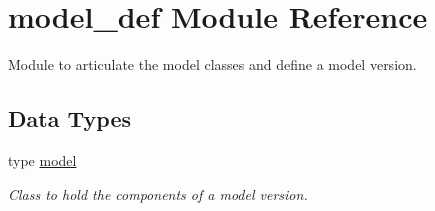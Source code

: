 \hypertarget{namespacemodel__def}{}\section{model\+\_\+def Module Reference}
\label{namespacemodel__def}


Module to articulate the model classes and define a model version.  


\subsection*{Data Types}
\begin{DoxyCompactItemize}
\item 
type \hyperlink{structmodel__def_1_1model}{model}
\begin{DoxyCompactList}\small\item\em Class to hold the components of a model version. \end{DoxyCompactList}\end{DoxyCompactItemize}
